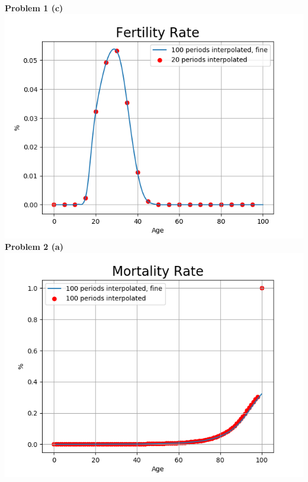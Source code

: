 \documentclass[letterpaper,12pt]{article}
\theoremstyle{definition}
\begin{document}
\noindent\textbf{Problem 1 (c)}\\
\includegraphics[scale=0.5]{images_dem/fert_rate_20.png}
\\

\noindent\textbf{Problem 2 (a)}\\
\includegraphics[scale=0.5]{images_dem/mort_rate_100.png}
\\
\end{document}
